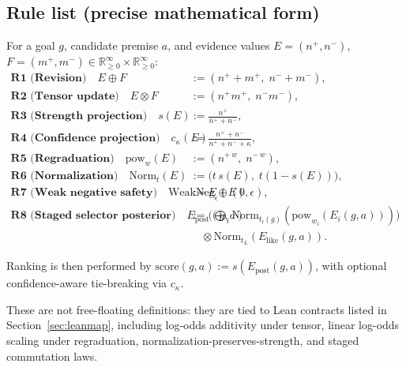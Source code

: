 \documentclass[11pt]{article}
\begin{document}
\subsection{Rule list (precise mathematical form)}
For a goal \(g\), candidate premise \(a\), and evidence values
\(E=(n^+,n^-)\), \(F=(m^+,m^-)\in \mathbb{R}_{\ge 0}^{\infty}\times\mathbb{R}_{\ge 0}^{\infty}\):
\begin{align*}
\textbf{R1 (Revision)}\quad
E \oplus F &:= (n^+ + m^+,\; n^- + m^-),\\
\textbf{R2 (Tensor update)}\quad
E \otimes F &:= (n^+ m^+,\; n^- m^-),\\
\textbf{R3 (Strength projection)}\quad
s(E) &:= \frac{n^+}{n^+ + n^-},\\
\textbf{R4 (Confidence projection)}\quad
c_\kappa(E) &:= \frac{n^+ + n^-}{n^+ + n^- + \kappa},\\
\textbf{R5 (Regraduation)}\quad
\mathrm{pow}_w(E) &:= (n^{+\,w},\; n^{-\,w}),\\
\textbf{R6 (Normalization)}\quad
\mathrm{Norm}_t(E) &:= \big(t\,s(E),\; t(1-s(E))\big),\\
\textbf{R7 (Weak negative safety)}\quad
\mathrm{WeakNeg}_\epsilon(E) &:= E \oplus (0,\epsilon),\\
\textbf{R8 (Staged selector posterior)}\quad
E_{\mathrm{post}}(g,a) &:=
\Big(\bigoplus_i \mathrm{Norm}_{t_i(g)}(\mathrm{pow}_{w_i}(E_i(g,a)))\Big)\\
&\quad\otimes \mathrm{Norm}_{t_L}(E_{\mathrm{like}}(g,a)).
\end{align*}

\noindent
Ranking is then performed by
\(
\mathrm{score}(g,a):=s(E_{\mathrm{post}}(g,a))
\),
with optional confidence-aware tie-breaking via \(c_\kappa\).

\noindent
These are not free-floating definitions: they are tied to Lean contracts listed
in Section~\ref{sec:leanmap}, including log-odds additivity under tensor,
linear log-odds scaling under regraduation, normalization-preserves-strength,
and staged commutation laws.
\end{document}
